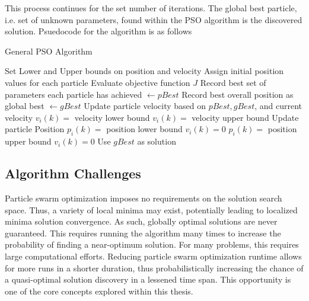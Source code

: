 \noindent This process continues for the set number of iterations. The global best particle, i.e. set of unknown parameters, found 
within the PSO algorithm is the discovered solution. Psuedocode for the algorithm is as follows

\begin{algorithm}[H]
    \caption{General PSO Algorithm}
    \begin{algorithmic}
    
    \STATE Set Lower and Upper bounds on position and velocity
    \STATE Assign initial position values for each particle
    \ENDFOR
    \STATE Evaluate objective function $J$
    \ENDFOR
    \STATE Record best set of parameters each particle has achieved $\leftarrow pBest$
    \STATE Record best overall position as global best $\leftarrow gBest$
    \STATE Update particle velocity based on $pBest, gBest$, and current velocity
    \STATE $v_i(k) = $ velocity lower bound
    \STATE $v_i(k) = $ velocity upper bound
    \ENDIF
    \STATE Update particle Position
    \STATE $p_i(k) = $ position lower bound
    \STATE $v_i(k) = 0$
    \STATE $p_i(k) = $ position upper bound
    \STATE $v_i(k) = 0$
    \ENDIF
    \ENDFOR
    \ENDFOR
    \STATE Use $gBest$ as solution
    \end{algorithmic}
    \label{alg:PSOGeneral}

\end{algorithm}

\subsection{Algorithm Challenges}

\noindent Particle swarm optimization imposes no requirements on the solution search space. 
Thus, a variety of local minima may exist, potentially leading to localized minima solution convergence. As such, globally optimal solutions are never guaranteed.
This requires running the algorithm many times to increase the probability of finding a near-optimum solution.
For many problems, this requires large computational efforts. Reducing particle swarm optimization runtime
allows for more runs in a shorter duration, 
thus probabilistically increasing the chance of a quasi-optimal solution discovery in a lessened time span.
This opportunity is one of the core concepts explored within this thesis.  \newline



